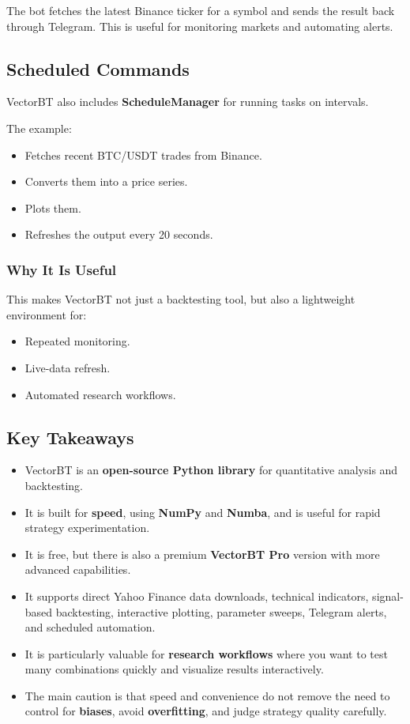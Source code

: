 \documentclass[12pt,openany]{book}
\begin{document}
The bot fetches the latest Binance ticker for a symbol and sends the result back through Telegram. This is useful for monitoring markets and automating alerts.

\subsection{Scheduled Commands}

VectorBT also includes \textbf{ScheduleManager} for running tasks on intervals.

The example:

\begin{itemize}[leftmargin=*]
    \item Fetches recent BTC/USDT trades from Binance.
    \item Converts them into a price series.
    \item Plots them.
    \item Refreshes the output every 20 seconds.
\end{itemize}

\subsubsection{Why It Is Useful}

This makes VectorBT not just a backtesting tool, but also a lightweight environment for:

\begin{itemize}[leftmargin=*]
    \item Repeated monitoring.
    \item Live-data refresh.
    \item Automated research workflows.
\end{itemize}

\subsection{Key Takeaways}

\begin{itemize}[leftmargin=*]
    \item VectorBT is an \textbf{open-source Python library} for quantitative analysis and backtesting.
    \item It is built for \textbf{speed}, using \textbf{NumPy} and \textbf{Numba}, and is useful for rapid strategy experimentation.
    \item It is free, but there is also a premium \textbf{VectorBT Pro} version with more advanced capabilities.
    \item It supports direct Yahoo Finance data downloads, technical indicators, signal-based backtesting, interactive plotting, parameter sweeps, Telegram alerts, and scheduled automation.
    \item It is particularly valuable for \textbf{research workflows} where you want to test many combinations quickly and visualize results interactively.
    \item The main caution is that speed and convenience do not remove the need to control for \textbf{biases}, avoid \textbf{overfitting}, and judge strategy quality carefully.
\end{itemize}
\end{document}
